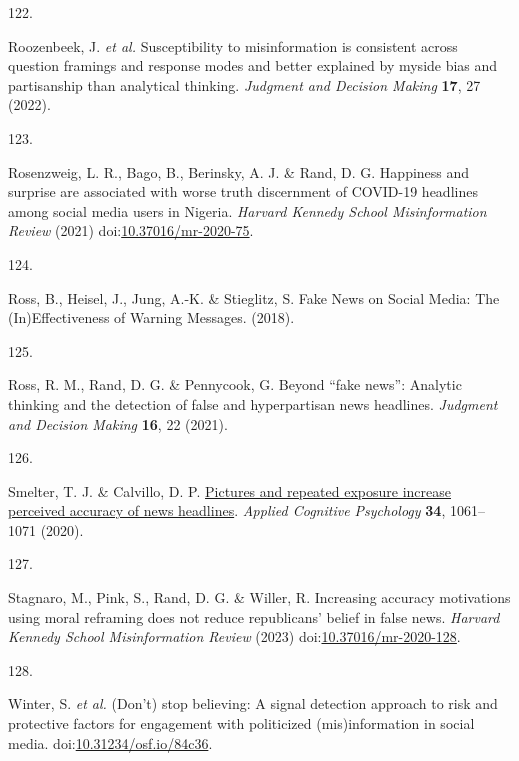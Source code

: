 \documentclass[
  man]{apa6}
\newlength{\cslhangindent}
\newlength{\csllabelwidth}
\newenvironment{CSLReferences}[2] %
 {\begin{list}{}{%
  \setlength{\itemindent}{0pt}
  \setlength{\leftmargin}{0pt}
  \setlength{\parsep}{0pt}
  \ifodd #1
   \setlength{\leftmargin}{\cslhangindent}
   \setlength{\itemindent}{-1\cslhangindent}
  \fi
  \setlength{\itemsep}{#2\baselineskip}}}
 {\end{list}}
\newcommand{\CSLLeftMargin}[1]{\parbox[t]{\csllabelwidth}{\strut#1\strut}}
\newcommand{\CSLRightInline}[1]{\parbox[t]{\linewidth - \csllabelwidth}{\strut#1\strut}}
\begin{document}
\begin{CSLReferences}{0}{0}
\CSLLeftMargin{122. }%
\CSLRightInline{*Roozenbeek, J. \emph{et al.} Susceptibility to misinformation is consistent across question framings and response modes and better explained by myside bias and partisanship than analytical thinking. \emph{Judgment and Decision Making} \textbf{17}, 27 (2022).}

\CSLLeftMargin{123. }%
\CSLRightInline{*Rosenzweig, L. R., Bago, B., Berinsky, A. J. \& Rand, D. G. Happiness and surprise are associated with worse truth discernment of COVID-19 headlines among social media users in Nigeria. \emph{Harvard Kennedy School Misinformation Review} (2021) doi:\href{https://doi.org/10.37016/mr-2020-75}{10.37016/mr-2020-75}.}

\CSLLeftMargin{124. }%
\CSLRightInline{*Ross, B., Heisel, J., Jung, A.-K. \& Stieglitz, S. Fake News on Social Media: The (In)Effectiveness of Warning Messages. (2018).}

\CSLLeftMargin{125. }%
\CSLRightInline{*Ross, R. M., Rand, D. G. \& Pennycook, G. Beyond {``}fake news{''}: Analytic thinking and the detection of false and hyperpartisan news headlines. \emph{Judgment and Decision Making} \textbf{16}, 22 (2021).}

\CSLLeftMargin{126. }%
\CSLRightInline{*Smelter, T. J. \& Calvillo, D. P. \href{https://doi.org/10.1002/acp.3684}{Pictures and repeated exposure increase perceived accuracy of news headlines}. \emph{Applied Cognitive Psychology} \textbf{34}, 1061--1071 (2020).}

\CSLLeftMargin{127. }%
\CSLRightInline{*Stagnaro, M., Pink, S., Rand, D. G. \& Willer, R. Increasing accuracy motivations using moral reframing does not reduce republicans{'} belief in false news. \emph{Harvard Kennedy School Misinformation Review} (2023) doi:\href{https://doi.org/10.37016/mr-2020-128}{10.37016/mr-2020-128}.}

\CSLLeftMargin{128. }%
\CSLRightInline{*Winter, S. \emph{et al.} (Don{'}t) stop believing: A signal detection approach to risk and protective factors for engagement with politicized (mis)information in social media. doi:\href{https://doi.org/10.31234/osf.io/84c36}{10.31234/osf.io/84c36}.}


\end{CSLReferences}
\end{document}
